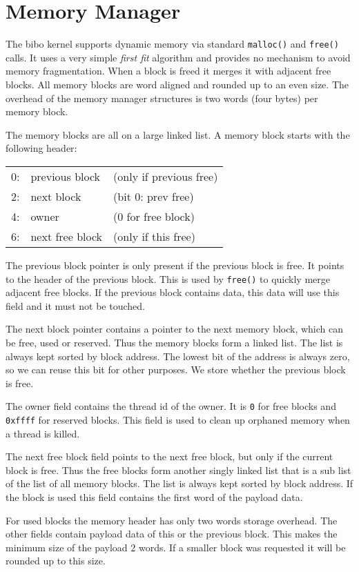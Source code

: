 \documentclass[twocolumn]{article}
\begin{document}
  \section{Memory Manager}
  The bibo kernel supports dynamic memory via standard \verb|malloc()| and
  \verb|free()| calls.  It uses a very simple \emph{first fit} algorithm and
  provides no mechanism to avoid memory fragmentation.  When a block is freed
  it merges it with adjacent free blocks.  All memory blocks are word aligned
  and rounded up to an even size.  The overhead of the memory manager
  structures is two words (four bytes) per memory block.

  The memory blocks are all on a large linked list.  A memory block starts
  with the following header:
  \begin{center}
  \begin{tabular}{r|ll|}
    \cline{2-3}
    0: & previous block & (only if previous free)\\
    \cline{2-3}
    2: & next block  &(bit 0: prev free)   \\
    4: & owner &(0 for free block) \\
    \cline{2-3}
    6: & next free block & (only if this free)\\
    \cline{2-3}
  \end{tabular}
  \end{center}
  The previous block pointer is only present if the previous block is free.
  It points to the header of the previous block. This is used by \verb|free()|
  to quickly merge adjacent free blocks.  If the previous block contains data,
  this data will use this field and it must not be touched.

  The next block pointer contains a pointer to the next memory block, which
  can be free, used or reserved.  Thus the memory blocks form a linked
  list. The list is always kept sorted by block address. The lowest bit of the
  address is always zero, so we can reuse this bit for other purposes.  We
  store whether the previous block is free.

  The owner field contains the thread id of the owner.  It is \verb$0$ for
  free blocks and \verb$0xffff$ for reserved blocks.  This field is used to
  clean up orphaned memory when a thread is killed.

  The next free block field points to the next free block, but only if the
  current block is free.  Thus the free blocks form another singly linked list
  that is a sub list of the list of all memory blocks.  The list is always
  kept sorted by block address.  If the block is used this field contains the
  first word of the payload data.

  For used blocks the memory header has only two words storage overhead.  The
  other fields contain payload data of this or the previous block.  This makes
  the minimum size of the payload 2 words.  If a smaller block was requested
  it will be rounded up to this size.
\end{document}
